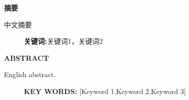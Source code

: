 \begin{center}
    \thispagestyle{empty}
    \fontsize{18pt}{\baselineskip}\bf\textsf{摘\quad 要}
    \vspace{10pt}

\end{center}

\vspace{10pt}

中文摘要

\begin{figure}[b]
    \qquad \textbf{关键词:}关键词1，关键词2
\end{figure}

\newpage

\begin{center}
    \thispagestyle{empty}
    \fontsize{18pt}{\baselineskip}\sf\textbf{ABSTRACT}
    \vspace{10pt}

\end{center}

\vspace{10pt}
\setlength{\parindent}{0em}

English abstract.


\begin{figure}[b]
    \textbf{KEY WORDS:} [Keyword 1,\quad Keyword 2,\quad Keyword 3]
\end{figure}

\setlength{\parindent}{2em}